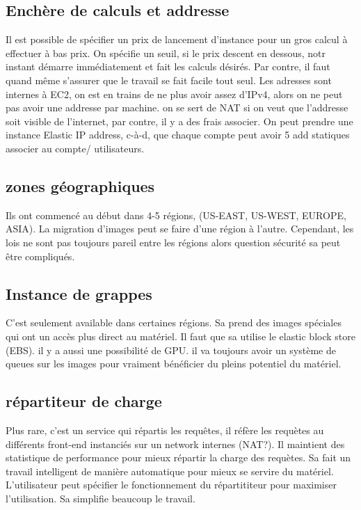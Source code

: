 \documentclass[oneside]{book}
\begin{document}
\subsection{Enchère de calculs et addresse}
Il est possible de spécifier un prix de lancement d'instance pour un gros calcul à effectuer à bas prix. On spécifie un seuil, si le prix descent en dessous, notr instant démarre immédiatement et fait les calculs désirés. Par contre, il faut quand même s'assurer que le travail se fait facile tout seul. Les adresses sont internes à EC2, on est en trains de ne plus avoir assez d'IPv4, alors on ne peut pas avoir une addresse par machine. on se sert de NAT si on veut que l'addresse soit visible de l'internet, par contre, il y a des frais associer.  On peut prendre une instance Elastic IP address, c-à-d, que chaque compte peut avoir 5 add statiques associer au compte/ utilisateurs.

\subsection{zones géographiques}
Ils ont commencé au début dans 4-5 régions,  (US-EAST, US-WEST, EUROPE, ASIA). La migration d'images peut se faire d'une région à l'autre. Cependant, les lois ne sont pas toujours pareil entre les régions alors question sécurité sa peut être compliqués. 

\subsection{Instance de grappes}
C'est seulement available dans certaines régions. Sa prend des images spéciales qui ont un accès plus direct au matériel. Il faut que sa utilise le elastic block store (EBS). il y a aussi une possibilité de GPU. il va toujours avoir un système de queues sur les images pour vraiment bénéficier du pleins potentiel du matériel. 

\subsection{répartiteur de charge}
Plus rare, c'est un service qui répartis les requêtes, il réfère les requètes au différents front-end instanciés sur un network internes (NAT?). Il maintient des statistique de performance pour mieux répartir la charge des requètes. Sa fait un travail intelligent de manière automatique pour mieux se servire du matériel. L'utilisateur peut spécifier le fonctionnement du répartititeur pour maximiser l'utilisation. Sa simplifie beaucoup le travail.
\end{document}
